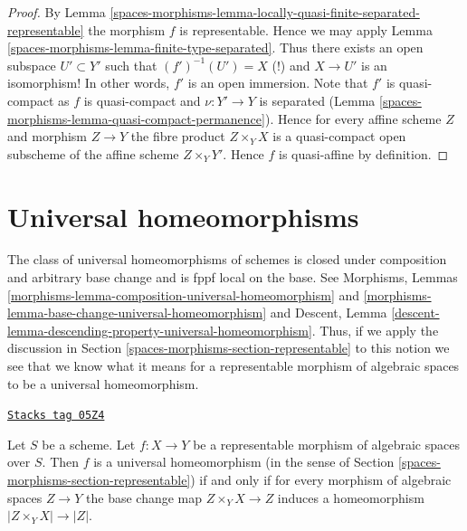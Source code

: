 \begin{proof}
By Lemma \ref{spaces-morphisms-lemma-locally-quasi-finite-separated-representable}
the morphism $f$ is representable. Hence we may apply
Lemma \ref{spaces-morphisms-lemma-finite-type-separated}. Thus there exists an open
subspace $U' \subset Y'$ such that
$(f')^{-1}(U') = X$ (!) and $X \to U'$ is an isomorphism! In other
words, $f'$ is an open immersion. Note that $f'$ is quasi-compact as
$f$ is quasi-compact and $\nu : Y' \to Y$ is separated
(Lemma \ref{spaces-morphisms-lemma-quasi-compact-permanence}).
Hence for every affine scheme $Z$ and morphism $Z \to Y$ the
fibre product $Z \times_Y X$ is a quasi-compact open subscheme
of the affine scheme $Z \times_Y Y'$. Hence $f$ is quasi-affine by
definition.
\end{proof}

\section{Universal homeomorphisms}
\label{spaces-morphisms-section-universal-homeomorphisms}
The class of universal homeomorphisms of schemes is closed under
composition and arbitrary base change and is fppf local on the base. See
Morphisms, Lemmas
\ref{morphisms-lemma-composition-universal-homeomorphism} and
\ref{morphisms-lemma-base-change-universal-homeomorphism} and
Descent, Lemma \ref{descent-lemma-descending-property-universal-homeomorphism}.
Thus, if we apply the discussion in
Section \ref{spaces-morphisms-section-representable}
to this notion we see that we know what it means for a representable
morphism of algebraic spaces to be a universal homeomorphism.

\begin{lemma}
\label{spaces-morphisms-lemma-universal-homeomorphism-representable}
\href{https://stacks.math.columbia.edu/tag/05Z4}{\texttt{Stacks tag 05Z4}}

Let $S$ be a scheme.
Let $f : X \to Y$ be a representable morphism of algebraic spaces over $S$.
Then $f$ is a universal homeomorphism
(in the sense of Section \ref{spaces-morphisms-section-representable}) if and only
if for every morphism of algebraic spaces $Z \to Y$ the base change
map $Z \times_Y X \to Z$ induces a homeomorphism
$|Z \times_Y X| \to |Z|$.
\end{lemma}

